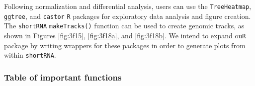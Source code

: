 \documentclass[12pt,twoside]{reedthesis}
\begin{document}
Following normalization and differential analysis, users can use the
\texttt{TreeHeatmap}, \texttt{ggtree}, and \texttt{castor} \texttt{R} packages for exploratory data analysis
and figure creation. The \texttt{shortRNA} \texttt{makeTracks()} function can be used to
create genomic tracks, as shown in Figures \ref{fig:3f15}, \ref{fig:3f18a}, and \ref{fig:3f18b}. We intend to
expand ou\texttt{R} package by writing wrappers for these packages in order to
generate plots from within \texttt{shortRNA}.

\hypertarget{table-of-important-functions}{%
\subsubsection{Table of important functions}\label{table-of-important-functions}}
\end{document}
